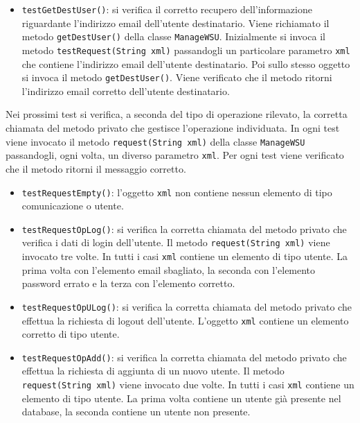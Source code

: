 {\begin{sloppypar}
{\begin{itemize}
\begin{itemize}
\begin{itemize}
						\item \texttt{testGetDestUser()}: si verifica il corretto recupero dell'informazione riguardante l'indirizzo email dell'utente destinatario. Viene richiamato il metodo \texttt{getDestUser()} della classe \texttt{ManageWSU}. Inizialmente si invoca il metodo \texttt{testRequest(String xml)} passandogli un particolare parametro \texttt{xml} che contiene l'indirizzo email dell'utente destinatario. Poi sullo stesso oggetto si invoca il metodo \texttt{getDestUser()}. Viene verificato che il metodo ritorni l'indirizzo email corretto dell'utente destinatario.
						\end{itemize}

Nei prossimi test si verifica, a seconda del tipo di operazione rilevato, la corretta chiamata del metodo privato che gestisce l'operazione individuata. In ogni test viene invocato il metodo \texttt{request(String xml)} della classe \texttt{ManageWSU} passandogli, ogni volta, un diverso parametro \texttt{xml}. Per ogni test viene verificato che il metodo ritorni il messaggio corretto.
					\begin{itemize}
						\item \texttt{testRequestEmpty()}: l'oggetto \texttt{xml} non contiene nessun elemento di tipo comunicazione o utente.
						
						\item \texttt{testRequestOpLog()}: si verifica la corretta chiamata del metodo privato che verifica i dati di login dell'utente. Il metodo \texttt{request(String xml)} viene invocato tre volte. In tutti i casi \texttt{xml} contiene un elemento di tipo utente. La prima volta con l'elemento email sbagliato, la seconda con l'elemento password errato e la terza con l'elemento corretto.
						   
						\item \texttt{testRequestOpULog()}: si verifica la corretta chiamata del metodo privato che effettua la richiesta di logout dell'utente. L'oggetto \texttt{xml} contiene un elemento corretto di tipo utente.
						
						\item \texttt{testRequestOpAdd()}: si verifica la corretta chiamata del metodo privato che effettua la richiesta di aggiunta di un nuovo utente. Il metodo \texttt{request(String xml)} viene invocato due volte. In tutti i casi \texttt{xml} contiene un elemento di tipo utente. La prima volta contiene un utente già presente nel database, la seconda contiene un utente non presente.
						

\end{itemize}
\end{itemize}
\end{itemize}}
\end{sloppypar}}
